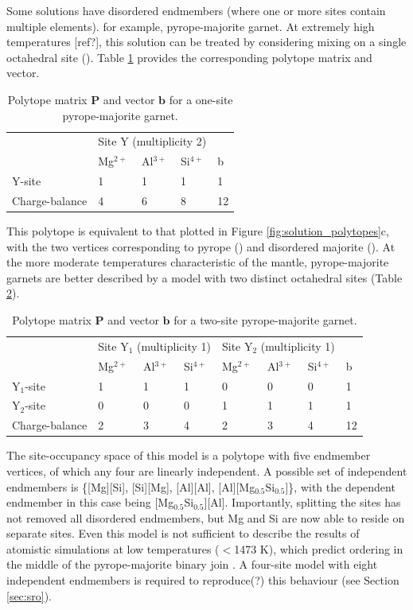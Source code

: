 \documentclass[preprint,12pt]{elsarticle}
\begin{document}
Some solutions have disordered endmembers (where one or more sites contain multiple elements). for example, pyrope-majorite garnet. At extremely high temperatures [ref?], this solution can be treated by considering mixing on a single octahedral site (). Table \ref{tab:maj_polytope} provides the corresponding polytope matrix and vector.
\begin{table}[htb!]
\centering
\begin{tabular}{llll|l}
               & \multicolumn{3}{l}{Site Y (multiplicity 2)} &   \\
               & Mg$^{2+}$ & Al$^{3+}$ & Si$^{4+}$ & b \\
               \hline
Y-site         & 1    & 1    & 1    & 1 \\
Charge-balance & 4    & 6    & 8    & 12
\end{tabular}
\caption{Polytope matrix $\boldsymbol{P}$ and vector $\boldsymbol{b}$ for a one-site pyrope-majorite garnet.}
\label{tab:maj_polytope}
\end{table}
This polytope is equivalent to that plotted in Figure \ref{fig:solution_polytopes}c, with the two vertices corresponding to pyrope () and disordered majorite (). At the more moderate temperatures characteristic of the mantle, pyrope-majorite garnets are better described by a model with two distinct octahedral sites (Table \ref{tab:maj2_polytope}).
\begin{table}[htb!]
\centering
\begin{tabular}{lllllll|l}
               & \multicolumn{3}{l}{Site Y$_1$ (multiplicity 1)} & \multicolumn{3}{l}{Site Y$_2$ (multiplicity 1)} &   \\
               & Mg$^{2+}$ & Al$^{3+}$ & Si$^{4+}$ & Mg$^{2+}$ & Al$^{3+}$ & Si$^{4+}$ & b \\
               \hline
Y$_1$-site         & 1    & 1    & 1    & 0    & 0    & 0    & 1 \\
Y$_2$-site         & 0    & 0    & 0    & 1    & 1    & 1    & 1 \\
Charge-balance     & 2    & 3    & 4    & 2    & 3    & 4   & 12
\end{tabular}
\caption{Polytope matrix $\boldsymbol{P}$ and vector $\boldsymbol{b}$ for a two-site pyrope-majorite garnet.}
\label{tab:maj2_polytope}
\end{table}
The site-occupancy space of this model is a polytope with five endmember vertices, of which any four are linearly independent. A possible set of independent endmembers is \{[Mg][Si], [Si][Mg], [Al][Al], [Al][Mg$_{0.5}$Si$_{0.5}$]\}, with the dependent endmember in this case being [Mg$_{0.5}$Si$_{0.5}$][Al]. Importantly, splitting the sites has not removed all disordered endmembers, but Mg and Si are now able to reside on separate sites. Even this model is not sufficient to describe the results of atomistic simulations at low temperatures ($<$1473 K), which predict ordering in the middle of the pyrope-majorite binary join \citep{Vinograd2006}. A four-site model with eight independent endmembers is required to reproduce(?) this behaviour (see Section \ref{sec:sro}). 
\end{document}
